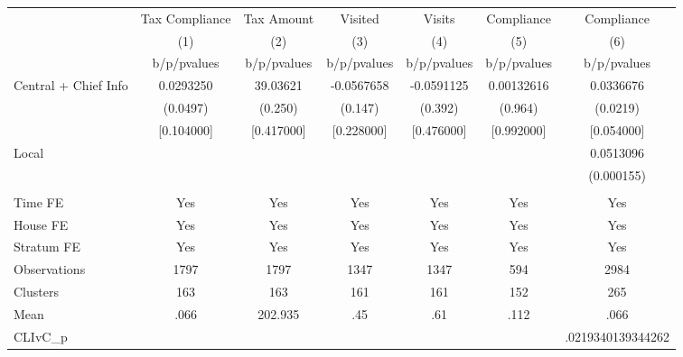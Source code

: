 {
\def\sym#1{\ifmmode^{#1}\else\(^{#1}\)\fi}
\begin{tabular}{l*{6}{c}}
\toprule
                &\multicolumn{1}{c}{Tax Compliance}&\multicolumn{1}{c}{Tax Amount}&\multicolumn{1}{c}{Visited}&\multicolumn{1}{c}{Visits}&\multicolumn{1}{c}{Compliance}&\multicolumn{1}{c}{Compliance}\\
                &\multicolumn{1}{c}{(1)}&\multicolumn{1}{c}{(2)}&\multicolumn{1}{c}{(3)}&\multicolumn{1}{c}{(4)}&\multicolumn{1}{c}{(5)}&\multicolumn{1}{c}{(6)}\\
                &b/p/pvalues&b/p/pvalues&b/p/pvalues&b/p/pvalues&b/p/pvalues&b/p/pvalues\\
\midrule
Central + Chief Info&0.0293250& 39.03621&-0.0567658&-0.0591125&0.00132616&0.0336676\\
                & (0.0497)&  (0.250)&  (0.147)&  (0.392)&  (0.964)& (0.0219)\\
                &[0.104000]&[0.417000]&[0.228000]&[0.476000]&[0.992000]&[0.054000]\\
Local           &         &         &         &         &         &0.0513096\\
                &         &         &         &         &         &(0.000155)\\
                &         &         &         &         &         &         \\
Time FE         &      Yes&      Yes&      Yes&      Yes&      Yes&      Yes\\
House FE        &      Yes&      Yes&      Yes&      Yes&      Yes&      Yes\\
Stratum FE      &      Yes&      Yes&      Yes&      Yes&      Yes&      Yes\\
\midrule
Observations    &     1797&     1797&     1347&     1347&      594&     2984\\
Clusters        &      163&      163&      161&      161&      152&      265\\
Mean            &     .066&  202.935&      .45&      .61&     .112&     .066\\
CLIvC\_p         &         &         &         &         &         &.0219340139344262\\
\bottomrule
\end{tabular}
}

